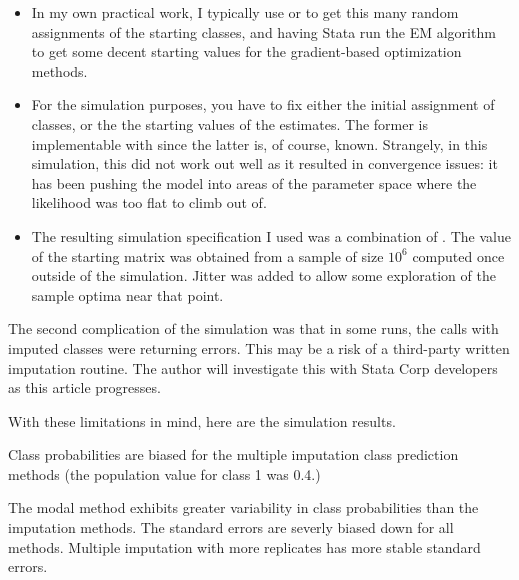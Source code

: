 \begin{itemize}
  \item In my own practical work, I typically use 
     or 
    to get this many random assignments of the starting classes,
    and having Stata run the EM algorithm to get some decent 
    starting values for the gradient-based optimization methods.
  \item For the simulation purposes, you have to fix either 
    the initial assignment of classes, or the the starting values 
    of the estimates. The former is implementable with 
     since 
    the latter is, of course, known. Strangely, in this simulation,
    this did not work out well as it resulted in convergence issues:
    it has been pushing the model into areas of the parameter space
    where the likelihood was too flat to climb out of.
  \item The resulting simulation specification I used was a combination
    of . 
    The value of the starting matrix  was obtained
    from a sample of size $10^6$ computed once outside of the simulation.
    Jitter was added to allow some exploration of the sample optima 
    near that point.
\end{itemize}

The second complication of the simulation was that in some runs,
the  calls with imputed classes were returning 
errors. This may be a risk of a third-party written imputation routine.
The author will investigate this with Stata Corp developers as this
article progresses.

\begin{stlog}
  \nullskip
\end{stlog}
  
  

With these limitations in mind, here are the simulation results.

Class probabilities are biased for the multiple imputation class prediction
methods (the population value for class 1 was 0.4.)

\begin{stlog} 
  \nullskip
\end{stlog}

The modal method exhibits greater variability
in class probabilities than the imputation methods.
The standard errors are severly biased down for all methods. 
Multiple imputation with more replicates has 
more stable standard errors.

